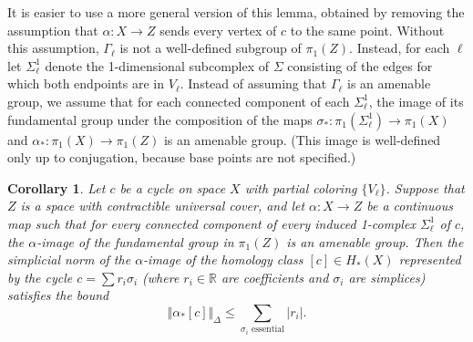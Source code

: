 \documentclass[psamsfonts]{amsart}
\newtheorem{corollary}[theorem]{Corollary}
\theoremstyle{remark}
\newcommand{\abs}[1]{\left\lvert #1 \right\rvert}
\begin{document}
It is easier to use a more general version of this lemma, obtained by removing the assumption that $\alpha : X \rightarrow Z$ sends every vertex of $c$ to the same point.  Without this assumption, $\Gamma_\ell$ is not a well-defined subgroup of $\pi_1(Z)$.  Instead, for each $\ell$ let $\Sigma_\ell^1$ denote the 1-dimensional subcomplex of $\Sigma$ consisting of the edges for which both endpoints are in $V_\ell$.  Instead of assuming that $\Gamma_\ell$ is an amenable group, we assume that for each connected component of each $\Sigma_\ell^1$, the image of its fundamental group under the composition of the maps $\sigma_*: \pi_1(\Sigma_\ell^1) \rightarrow \pi_1(X)$ and $\alpha_*: \pi_1(X) \rightarrow \pi_1(Z)$ is an amenable group.  (This image is well-defined only up to conjugation, because base points are not specified.)

\begin{corollary}\label{amen-red-cor}
Let $c$ be a cycle on space $X$ with partial coloring $\{V_\ell\}$.  Suppose that $Z$ is a space with contractible universal cover, and let $\alpha : X \rightarrow Z$ be a continuous map such that for every connected component of every induced 1-complex $\Sigma^1_\ell$ of $c$, the $\alpha$-image of the fundamental group in $\pi_1(Z)$ is an amenable group.  Then the simplicial norm of the $\alpha$-image of the homology class $[c] \in H_*(X)$ represented by the cycle $c = \sum r_i \sigma_i$ (where $r_i \in \mathbb{R}$ are coefficients and $\sigma_i$ are simplices) satisfies the bound
\[\Vert \alpha_*[c]\Vert_{\Delta} \leq \sum_{\sigma_i \textrm{ essential}} \abs{r_i}.\]
\end{corollary}
\end{document}
